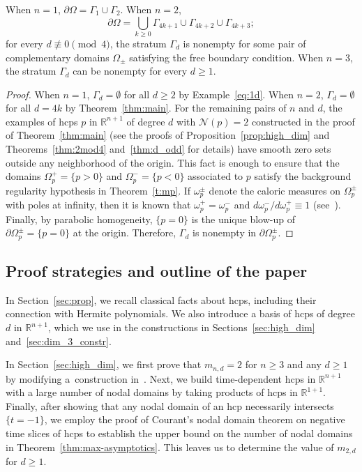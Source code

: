 \documentclass[AHL,Unicode,longabstracts,published]{cedram}
\newcommand{\R}{\mathbb{R}}
\newcommand{\nodal}{\mathcal{N}}
\newcommand{\R}{\mathbb{R}}
\begin{document}
\begin{theo}
When $n=1$, {$\partial\Omega=\Gamma_1 \cup \Gamma_2$}. When $n=2$,
\begin{equation}
\partial\Omega=\bigcup_{k\geq 0} \Gamma_{4k+1}\cup\Gamma_{4k+2}\cup\Gamma_{4k+3};
\end{equation}
for every $d\not\equiv 0\pmod 4$, the stratum $\Gamma_d$ is nonempty for some pair of {complementary domains $\Omega_{\pm}$} {satisfying} the free boundary condition. When $n=3$, the stratum $\Gamma_d$ can be nonempty for every $d\geq 1$.
\end{theo}

\begin{proof}
When $n=1$, $\Gamma_d=\emptyset$ for all $d\geq 2$ by Example~\ref{eq:1d}. When $n=2$, $\Gamma_d=\emptyset$ for all $d=4k$ by Theorem~\ref{thm:main}. For the remaining pairs of $n$ and $d$, the examples of hcps $p$ in $\R^{n+1}$ of degree $d$ with $\nodal(p)=2$ constructed in the proof of Theorem~\ref{thm:main} (see the proofs of Proposition~\ref{prop:high_dim} and Theorems~\ref{thm:2mod4} and~\ref{thm:d_odd} for details) have smooth zero sets outside any neighborhood of the origin. This fact is enough to ensure that the domains $\Omega_p^+=\{p>0\}$ and $\Omega_p^-=\{p<0\}$ associated to $p$ satisfy the background regularity hypothesis in Theorem~\ref{t:mp}. If $\omega_p^\pm$ denote the caloric measures on $\Omega_p^\pm$ with poles at infinity, then it is known that $\omega_p^+=\omega_p^-$ and $d\omega_p^-/d\omega_p^+\equiv 1$ (see~\cite[Section~6]{MP21}). Finally, by parabolic homogeneity, $\{p=0\}$ is the unique blow-up of $\partial\Omega_p^\pm=\{p=0\}$ at the origin. Therefore, $\Gamma_d$ is nonempty in $\partial\Omega^\pm_p$.
\end{proof}

\subsection{Proof strategies and outline of the paper} \label{ss:organize}


In Section~\ref{sec:prop}, we recall classical facts about hcps, including their connection with Hermite polynomials. We also introduce a basis of hcps of degree $d$ in $\R^{n+1}$, which we use in the constructions in Sections~\ref{sec:high_dim} and~\ref{sec:dim_3_constr}.

In Section~\ref{sec:high_dim}, we first prove that $m_{n,d} = 2$ for $n \ge 3$ and any $d \ge 1$ by modifying a~construction in~\cite{BET17}. Next, we build time-dependent hcps in $\R^{n+1}$ with a large number of nodal domains by taking products of hcps in $\R^{1+1}$. Finally, after showing that any nodal domain of an hcp necessarily intersects $\{t=-1\}$, we employ the proof of Courant's nodal domain theorem on negative time slices of hcps to establish the upper bound on the number of nodal domains in Theorem~\ref{thm:max-asymptotics}. This leaves us to determine the value of $m_{2,d}$ for $d \ge 1$.
\end{document}
